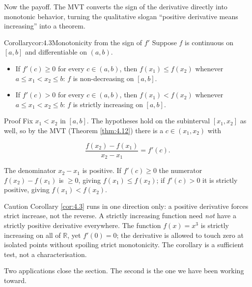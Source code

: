 \documentclass[a4paper,12pt,oneside]{memoir}
\begin{document}
Now the payoff. The MVT converts the sign of the derivative directly into monotonic behavior, turning the qualitative slogan “positive derivative means increasing” into a theorem.

\begin{envcorollary}{Corollary}{cor:4.3}{Monotonicity from the sign of \(f'\)}
Suppose \(f\) is continuous on \([a, b]\) and differentiable on \((a, b)\).

\begin{itemize}
  \item If \(f'(c) \ge 0\) for every \(c \in (a, b)\), then \(f(x_{1}) \le f(x_{2})\) whenever \(a \le x_{1} < x_{2} \le b\): \(f\) is non-decreasing on \([a, b]\).
  \item If \(f'(c) > 0\) for every \(c \in (a, b)\), then \(f(x_{1}) < f(x_{2})\) whenever \(a \le x_{1} < x_{2} \le b\): \(f\) is strictly increasing on \([a, b]\).
\end{itemize}
\end{envcorollary}
\begin{envproof}{Proof}{}{}
Fix \(x_{1} < x_{2}\) in \([a, b]\). The hypotheses hold on the subinterval \([x_{1}, x_{2}]\) as well, so by the MVT (Theorem \ref{thm:4.12}) there is a \(c \in (x_{1}, x_{2})\) with

\[ \frac{f(x_{2}) - f(x_{1})}{x_{2} - x_{1}} = f'(c). \]

The denominator \(x_{2} - x_{1}\) is positive. If \(f'(c) \ge 0\) the numerator \(f(x_{2}) - f(x_{1})\) is \(\ge 0\), giving \(f(x_{1}) \le f(x_{2})\); if \(f'(c) > 0\) it is strictly positive, giving \(f(x_{1}) < f(x_{2})\). \qedmark
\end{envproof}
\begin{envcaution}{Caution}{}{}
Corollary \ref{cor:4.3} runs in one direction only: a positive derivative forces strict increase, not the reverse. A strictly increasing function need \emph{not} have a strictly positive derivative everywhere. The function \(f(x) = x^{3}\) is strictly increasing on all of \(\mathbb{R}\), yet \(f'(0) = 0\); the derivative is allowed to touch zero at isolated points without spoiling strict monotonicity. The corollary is a sufficient test, not a characterisation.
\end{envcaution}
Two applications close the section. The second is the one we have been working toward.
\end{document}

